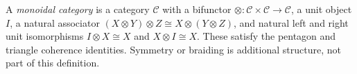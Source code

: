 
A \emph{monoidal category} is a category $\mathcal C$ with a bifunctor $\otimes:\mathcal C\times\mathcal C\to\mathcal C$, a unit object $I$, a natural associator $(X\otimes Y)\otimes Z\cong X\otimes(Y\otimes Z)$, and natural left and right unit isomorphisms $I\otimes X\cong X$ and $X\otimes I\cong X$. These satisfy the pentagon and triangle coherence identities. Symmetry or braiding is additional structure, not part of this definition.
